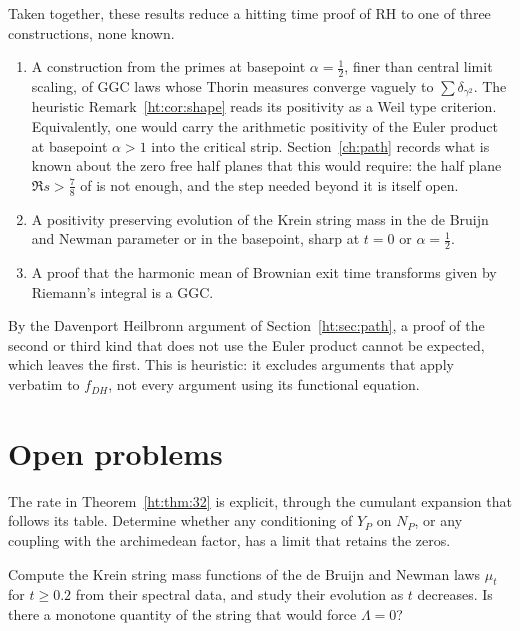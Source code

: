 Taken together, these results reduce a hitting time proof of RH to one of three constructions, none known.
\begin{enumerate}
\item A construction from the primes at basepoint $\alpha=\frac12$, finer than central limit scaling, of GGC laws whose Thorin measures converge vaguely to $\sum\delta_{\gamma^2}$. The heuristic Remark~\ref{ht:cor:shape} reads its positivity as a Weil type criterion. Equivalently, one would carry the arithmetic positivity of the Euler product at basepoint $\alpha>1$ into the critical strip. Section~\ref{ch:path} records what is known about the zero free half planes that this would require: the half plane $\Re s>\frac78$ of \cite{OAI26a} is not enough, and the step needed beyond it is itself open.
\item A positivity preserving evolution of the Krein string mass in the de Bruijn and Newman parameter or in the basepoint, sharp at $t=0$ or $\alpha=\frac12$.
\item A proof that the harmonic mean of Brownian exit time transforms given by Riemann's integral is a GGC.
\end{enumerate}
By the Davenport Heilbronn argument of Section~\ref{ht:sec:path}, a proof of the second or third kind that does not use the Euler product cannot be expected, which leaves the first. This is heuristic: it excludes arguments that apply verbatim to $f_{DH}$, not every argument using its functional equation.

\section{Open problems}\label{ht:sec:open}

\begin{problem}\label{ht:prob:rate}
The rate in Theorem~\ref{ht:thm:32} is explicit, through the cumulant expansion that follows its table. Determine whether any conditioning of $Y_P$ on $N_P$, or any coupling with the archimedean factor, has a limit that retains the zeros.
\end{problem}

\begin{problem}
Compute the Krein string mass functions of the de Bruijn and Newman laws $\mu_t$ for $t\ge0.2$ from their spectral data, and study their evolution as $t$ decreases. Is there a monotone quantity of the string that would force $\Lambda=0$?
\end{problem}

